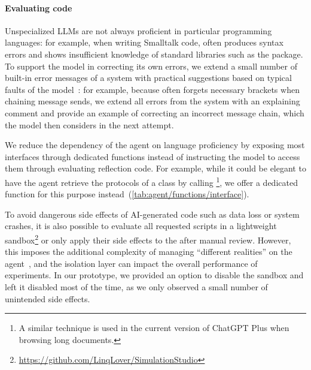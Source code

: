 \paragraph{Evaluating code}
Unspecialized LLMs are not always proficient in particular programming languages:
for example, when writing Smalltalk code, \gptfouro often produces syntax errors and shows insufficient knowledge of standard libraries such as the  package.
To support the model in correcting its own errors, we extend a small number of built-in error messages of a system with practical suggestions based on typical faults of the model~\cite{traver2010compiler}:
for example, because \gptfouro often forgets necessary brackets when chaining message sends, we extend all  errors from the system with an explaining comment and provide an example of correcting an incorrect message chain, which the model then considers in the next attempt.

We reduce the dependency of the agent on language proficiency by exposing most interfaces through dedicated functions instead of instructing the model to access them through evaluating reflection code.
For example, while it could be elegant to have the agent retrieve the protocols of a class by calling \footnote{A similar technique is used in the current version of ChatGPT Plus when browsing long documents.}, we offer a dedicated  function for this purpose instead~(\cref{tab:agent/functions/interface}).

To avoid dangerous side effects of AI-generated code such as data loss or system crashes, it is also possible to evaluate all requested scripts in a lightweight sandbox\footnote{\url{https://github.com/LinqLover/SimulationStudio}} or only apply their side effects to the after manual review.
However, this imposes the additional complexity of managing ``different realities'' on the agent~\cite{rehwaldt2012exploring}, and the isolation layer can impact the overall performance of experiments.
In our prototype, we provided an option to disable the sandbox and left it disabled most of the time, as we only observed a small number of unintended side effects.
